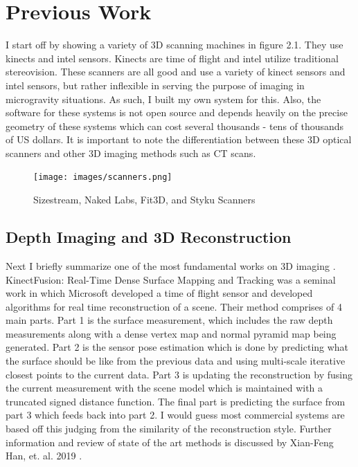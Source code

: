 \chapter{Previous Work}
I start off by showing a variety of 3D scanning machines in figure 2.1. They use kinects and intel sensors. Kinects are time of flight and intel utilize traditional stereovision.
These scanners are all good and use a variety of kinect sensors and intel sensors, but rather inflexible in serving the purpose of imaging in microgravity situations. As such, I built my own system for this. Also, the software for these systems is not open source and depends heavily on the precise geometry of these systems which can cost several thousands - tens of thousands of US dollars. It is important to note the differentiation between these 3D optical scanners and other 3D imaging methods such as CT scans.

\begin{figure}[!htb]
	\caption{Sizestream, Naked Labs, Fit3D, and Styku Scanners}
	\centering
	\texttt{[image: images/scanners.png]}
\end{figure}

\section{Depth Imaging and 3D Reconstruction}

Next I briefly summarize one of the most fundamental works on 3D imaging \cite{izadi2011kinectfusion}. KinectFusion: Real-Time Dense Surface Mapping and Tracking was a seminal work in which Microsoft developed a time of flight sensor and developed algorithms for real time reconstruction of a scene. Their method comprises of 4 main parts. Part 1 is the surface measurement, which includes the raw depth measurements along with a dense vertex map and normal pyramid map being generated. Part 2 is the sensor pose estimation which is done by predicting what the surface should be like from the previous data and using multi-scale iterative closest points to the current data. Part 3 is updating the reconstruction by fusing the current measurement with the scene model which is maintained with a truncated signed distance function. The final part is predicting the surface from part 3 which feeds back into part 2. I would guess most commercial systems are based off this judging from the similarity of the reconstruction style.
Further information and review of state of the art methods is discussed by Xian-Feng Han, et. al. 2019 \cite{DBLP:journals/corr/abs-1906-06543}.

